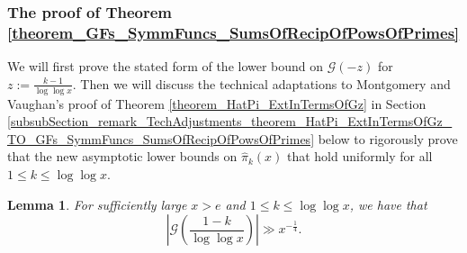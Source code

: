 \documentclass[11pt,reqno,a4letter]{article}
\numberwithin{figure}{section}
\numberwithin{table}{section}
\theoremstyle{plain}
\newtheorem{lemma}[theorem]{Lemma}
\numberwithin{theorem}{section}
\theoremstyle{definition}
\newcommand{\NBRef}[1]{}
\begin{document}
\subsubsection{The proof of Theorem \ref{theorem_GFs_SymmFuncs_SumsOfRecipOfPowsOfPrimes}} 

We will first prove the stated form of the lower bound on 
$\mathcal{G}(-z)$ for $z := \frac{k-1}{\log\log x}$. 
Then we will discuss the technical adaptations to Montgomery and Vaughan's proof of 
Theorem \ref{theorem_HatPi_ExtInTermsOfGz} in 
Section \ref{subsubSection_remark_TechAdjustments_theorem_HatPi_ExtInTermsOfGz_TO_GFs_SymmFuncs_SumsOfRecipOfPowsOfPrimes} 
below to rigorously prove that the new asymptotic lower bounds on $\widehat{\pi}_k(x)$ that hold uniformly for all 
$1 \leq k \leq \log\log x$. 

\NBRef{A06-2020-04-26} 
\begin{lemma} 
\label{lemma_theorem_HatPi_ExtInTermsOfGz} 
For sufficiently large $x > e$ and $1 \leq k \leq \log\log x$, we have that 
\[
\left\lvert 
     \mathcal{G}\left(\frac{1-k}{\log\log x}\right) \right\rvert 
     \gg x^{-\frac{1}{4}}. 
\]
\end{lemma} 
\end{document}
